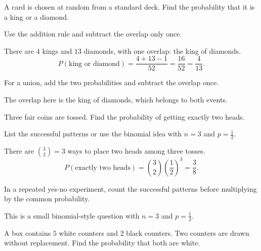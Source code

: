 \begin{problem}
A card is chosen at random from a standard deck. Find the probability that it is a king or a diamond.
\end{problem}

\begin{hint}
Use the addition rule and subtract the overlap only once.
\end{hint}

\begin{solution}
There are $4$ kings and $13$ diamonds, with one overlap: the king of diamonds.
\[
P(\text{king or diamond})=\frac{4+13-1}{52}=\frac{16}{52}=\frac4{13}.
\]
\end{solution}

\begin{takeaways}
\item For a union, add the two probabilities and subtract the overlap once.
\item The overlap here is the king of diamonds, which belongs to both events.
\end{takeaways}

\begin{problem}
Three fair coins are tossed. Find the probability of getting exactly two heads.
\end{problem}

\begin{hint}
List the successful patterns or use the binomial idea with $n=3$ and $p=\frac12$.
\end{hint}

\begin{solution}
There are $\binom32=3$ ways to place two heads among three tosses.
\[
P(\text{exactly two heads})=\binom32\left(\frac12\right)^3=\frac38.
\]
\end{solution}

\begin{takeaways}
\item In a repeated yes-no experiment, count the successful patterns before multiplying by the common probability.
\item This is a small binomial-style question with $n=3$ and $p=\frac12$.
\end{takeaways}

\begin{problem}
A box contains $5$ white counters and $2$ black counters. Two counters are drawn without replacement. Find the probability that both are white.
\end{problem}

